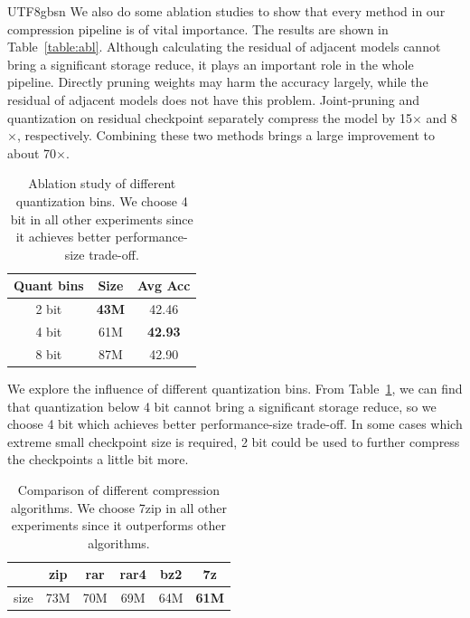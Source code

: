 \documentclass{article}
\theoremstyle{plain}
\theoremstyle{definition}
\theoremstyle{remark}
\begin{document}
\begin{CJK}{UTF8}{gbsn}
We also do some ablation studies to show that every method in our compression pipeline is of vital importance. The results are shown in Table~\ref{table:abl}. Although calculating the residual of adjacent models cannot bring a significant storage reduce, it plays an important role in the whole pipeline. Directly pruning weights may harm the accuracy largely, while the residual of adjacent models does not have this problem. Joint-pruning and quantization on residual checkpoint separately compress the model by 15$\times$ and 8$\times$, respectively. Combining these two methods brings a large improvement to about 70$\times$.


\begin{table}[t]

\vspace{-5pt}
\caption{Ablation study of different quantization bins. We choose 4 bit in all other experiments since it achieves better performance-size trade-off.}
\vspace{2pt}
\centering
\setlength{\tabcolsep}{12pt}
\begin{tabular}{c|cc}
\toprule
Quant bins & Size & Avg Acc \\ \midrule
2 bit      &  \textbf{43M}    &  42.46       \\
4 bit      &  61M    &  \textbf{42.93}       \\
8 bit      &  87M    &   42.90      \\ \bottomrule
\end{tabular}
\vspace{-10pt}
\label{table:quant-bins}
\end{table}

We explore the influence of different quantization bins. From Table~\ref{table:quant-bins}, we can find that quantization below 4 bit cannot bring a significant storage reduce, so we choose 4 bit which achieves better performance-size trade-off. In some cases which extreme small checkpoint size is required, 2 bit could be used to further compress the checkpoints a little bit more.

\begin{table}[t]
\vspace{-5pt}
\caption{Comparison of different compression algorithms. We choose 7zip in all other experiments since it outperforms other algorithms.}
\centering
\setlength{\tabcolsep}{8pt}
\begin{tabular}{c|ccccc}
\toprule
     & zip  & rar  & rar4 & bz2  & 7z   \\ \midrule
size & 73M & 70M & 69M & 64M & \textbf{61M} \\ \bottomrule
\end{tabular}


\end{table}
\end{CJK}
\end{document}
